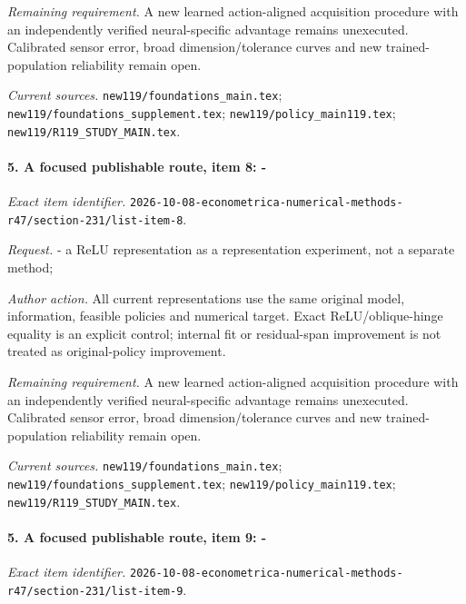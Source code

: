 \par\emph{Remaining requirement.} A new learned action-aligned acquisition procedure with an independently verified neural-specific advantage remains unexecuted. Calibrated sensor error, broad dimension/\allowbreak{}tolerance curves and new trained-population reliability remain open.

\par\emph{Current sources.} \nolinkurl{new119/foundations_main.tex}; \nolinkurl{new119/foundations_supplement.tex}; \nolinkurl{new119/policy_main119.tex}; \nolinkurl{new119/R119_STUDY_MAIN.tex}.

\paragraph{5. A focused publishable route, item 8: -}

\emph{Exact item identifier.} \nolinkurl{2026-10-08-econometrica-numerical-methods-r47/section-231/list-item-8}.

\par\emph{Request.} - a ReLU representation as a representation experiment, not a separate method;

\par\emph{Author action.} All current representations use the same original model, information, feasible policies and numerical target. Exact ReLU/\allowbreak{}oblique-hinge equality is an explicit control; internal fit or residual-span improvement is not treated as original-policy improvement.

\par\emph{Remaining requirement.} A new learned action-aligned acquisition procedure with an independently verified neural-specific advantage remains unexecuted. Calibrated sensor error, broad dimension/\allowbreak{}tolerance curves and new trained-population reliability remain open.

\par\emph{Current sources.} \nolinkurl{new119/foundations_main.tex}; \nolinkurl{new119/foundations_supplement.tex}; \nolinkurl{new119/policy_main119.tex}; \nolinkurl{new119/R119_STUDY_MAIN.tex}.

\paragraph{5. A focused publishable route, item 9: -}

\emph{Exact item identifier.} \nolinkurl{2026-10-08-econometrica-numerical-methods-r47/section-231/list-item-9}.

